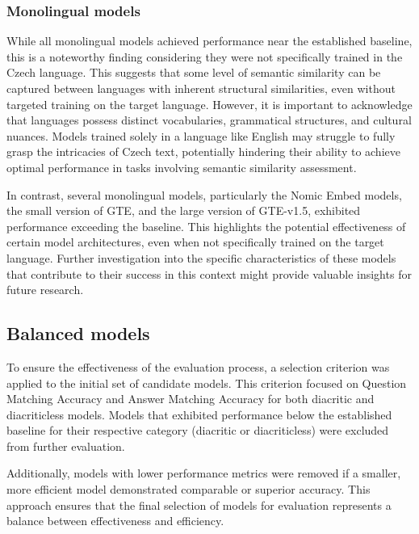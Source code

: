 \subsubsection{Monolingual models}

While all monolingual models achieved performance near the established baseline, this is a noteworthy finding considering they were not specifically trained in the Czech language.
This suggests that some level of semantic similarity can be captured between languages with inherent structural similarities, even without targeted training on the target language.
However, it is important to acknowledge that languages possess distinct vocabularies, grammatical structures, and cultural nuances.
Models trained solely in a language like English may struggle to fully grasp the intricacies of Czech text, potentially hindering their ability to achieve optimal performance in tasks involving semantic similarity assessment.

In contrast, several monolingual models, particularly the Nomic Embed models, the small version of \ac{GTE}, and the large version of \ac{GTE}-v1.5, exhibited performance exceeding the baseline.
This highlights the potential effectiveness of certain model architectures, even when not specifically trained on the target language.
Further investigation into the specific characteristics of these models that contribute to their success in this context might provide valuable insights for future research.



\subsection{Balanced models}
To ensure the effectiveness of the evaluation process, a selection criterion was applied to the initial set of candidate models.
This criterion focused on Question Matching Accuracy and Answer Matching Accuracy for both diacritic and diacriticless models.
Models that exhibited performance below the established baseline for their respective category (diacritic or diacriticless) were excluded from further evaluation.

Additionally, models with lower performance metrics were removed if a smaller, more efficient model demonstrated comparable or superior accuracy.
This approach ensures that the final selection of models for evaluation represents a balance between effectiveness and efficiency.



